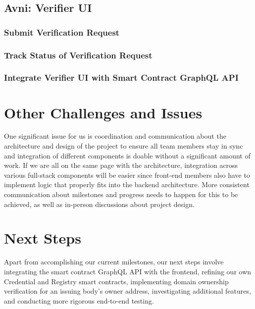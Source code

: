 \subsection{Avni: Verifier UI}
\subsubsection{Submit Verification Request}

\subsubsection{Track Status of Verification Request}

\subsubsection{Integrate Verifier UI with Smart Contract GraphQL API}

\section{Other Challenges and Issues}
One significant issue for us is coordination and communication about the architecture and design of the project to ensure all team members stay in sync and integration of different components is doable without a significant amount of work. If we are all on the same page with the architecture, integration across various full-stack components will be easier since front-end members also have to implement logic that properly fits into the backend architecture. More consistent communication about milestones and progress needs to happen for this to be achieved, as well as in-person discussions about project design.

\section{Next Steps}
Apart from accomplishing our current milestones, our next steps involve integrating the smart contract GraphQL API with the frontend, refining our own Credential and Registry smart contracts, implementing domain ownership verification for an issuing body’s owner address, investigating additional features, and conducting more rigorous end-to-end testing.


